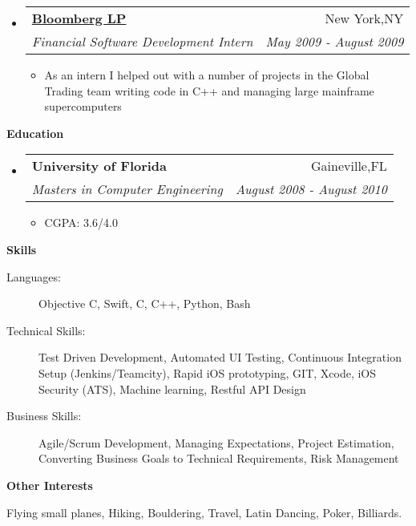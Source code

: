 \documentclass[letterpaper,11pt]{article}
\makeatletter
\newcommand{\resitem}[1]{\item #1 \vspace{-2pt}}
\newcommand{\resheading}[1]{{\large \colorbox{mygrey}{\begin{minipage}{\textwidth}{\textbf{#1 \vphantom{p\^{E}}}}\end{minipage}}}}
\newcommand{\ressubheading}[4]{
\begin{tabular*}{7.0in}{l@{\extracolsep{\fill}}r}
    \textbf{#1} & #2 \\
    \textit{#3} & \textit{#4} \\
\end{tabular*}\vspace{-6pt}}
\makeatother
\begin{document}
\begin{itemize}
\item
    \ressubheading{\href{http://www.bloomberg.com}{Bloomberg LP}}{New York,NY}{Financial Software Development Intern}{May 2009 - August 2009}
    \begin{itemize}
      \resitem{As an intern I helped out with a number of projects in the Global Trading team writing code in C++ and managing large mainframe supercomputers}
    \end{itemize}
    
    
\end{itemize}

\vspace{0.2in}
  
\resheading{Education}
\begin{itemize}
\item
    \ressubheading{University of Florida}{Gaineville,FL}{{Masters in Computer Engineering}}{August 2008 - August 2010}
    \begin{itemize}
        \resitem{CGPA: 3.6/4.0}
    \end{itemize}
\end{itemize}

\vspace{0.8in}

\resheading{Skills}
\begin{description}
\item[Languages:]
Objective C, Swift, C, C++, Python, Bash
\item[Technical Skills:] Test Driven Development, Automated UI Testing, Continuous Integration Setup (Jenkins/Teamcity), Rapid iOS prototyping, GIT, Xcode, iOS Security (ATS),
Machine learning, Restful API Design
\item[Business Skills:]
Agile/Scrum Development, Managing Expectations, Project Estimation, Converting Business Goals to Technical Requirements, Risk Management
\end{description}

\vspace{0.2in}

\resheading{Other Interests}
\begin{description}
\item Flying small planes, Hiking, Bouldering, Travel, Latin Dancing, Poker, Billiards.
\end{description}
\end{document}

